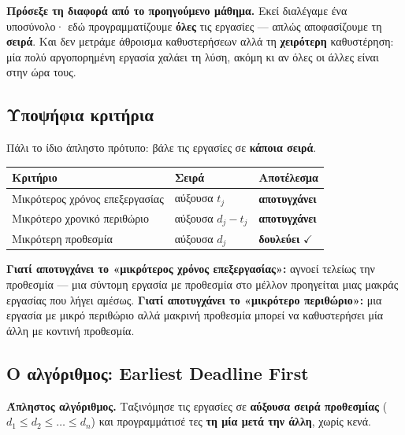 \documentclass[11pt,a4paper]{article}
\begin{document}
\begin{intuition}
\textbf{Πρόσεξε τη διαφορά από το προηγούμενο μάθημα.} Εκεί διαλέγαμε ένα
υποσύνολο· εδώ προγραμματίζουμε \textbf{όλες} τις εργασίες --- απλώς αποφασίζουμε
τη \textbf{σειρά}. Και δεν μετράμε άθροισμα καθυστερήσεων αλλά τη
\textbf{χειρότερη} καθυστέρηση: μία πολύ αργοπορημένη εργασία χαλάει τη λύση,
ακόμη κι αν όλες οι άλλες είναι στην ώρα τους.
\end{intuition}

\subsection{Υποψήφια κριτήρια}

Πάλι το ίδιο άπληστο πρότυπο: βάλε τις εργασίες σε \textbf{κάποια σειρά}.

\begin{center}
\begin{tabular}{@{}l l l@{}}
\toprule
Κριτήριο & Σειρά & Αποτέλεσμα \\
\midrule
Μικρότερος χρόνος επεξεργασίας & αύξουσα $t_j$       & \textbf{αποτυγχάνει} \\
Μικρότερο χρονικό περιθώριο    & αύξουσα $d_j - t_j$ & \textbf{αποτυγχάνει} \\
Μικρότερη προθεσμία            & αύξουσα $d_j$       & \textbf{δουλεύει} $\checkmark$ \\
\bottomrule
\end{tabular}
\end{center}

\begin{warningbox}
\textbf{Γιατί αποτυγχάνει το «μικρότερος χρόνος επεξεργασίας»:} αγνοεί τελείως
την προθεσμία --- μια σύντομη εργασία με προθεσμία στο μέλλον προηγείται μιας
μακράς εργασίας που λήγει αμέσως. \textbf{Γιατί αποτυγχάνει το «μικρότερο
περιθώριο»:} μια εργασία με μικρό περιθώριο αλλά μακρινή προθεσμία μπορεί να
καθυστερήσει μία άλλη με κοντινή προθεσμία.
\end{warningbox}

\subsection{Ο αλγόριθμος: Earliest Deadline First}

\begin{keypoint}
\textbf{Άπληστος αλγόριθμος.} Ταξινόμησε τις εργασίες σε \textbf{αύξουσα σειρά
προθεσμίας} ($d_1 \le d_2 \le \dots \le d_n$) και προγραμμάτισέ τες \textbf{τη
μία μετά την άλλη}, χωρίς κενά.
\end{keypoint}
\end{document}
